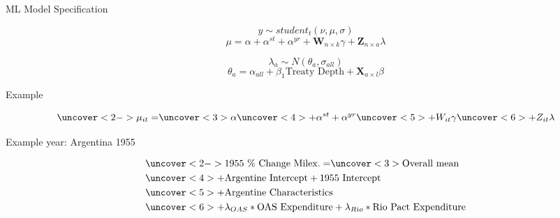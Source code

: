 \documentclass[12pt]{beamer}
\begin{document}


\begin{frame}{ML Model Specification}

\begin{equation}
y \sim student_t(\nu, \mu, \sigma)
\end{equation}
\begin{equation}
\mu = \alpha + \alpha^{st} + \alpha^{yr} +\textbf{W}_{n \times k} \gamma + \textbf{Z}_{n \times a} \lambda
\end{equation}

\begin{equation}
\lambda_{a} \sim N(\theta_{a}, \sigma_{all})
\end{equation}
\begin{equation}
\theta_a = \alpha_{all} + \beta_1 \mbox{Treaty Depth} + \textbf{X}_{a \times l} \beta
\end{equation}


\end{frame}



\begin{frame}{Example}


\begin{equation*}
\uncover<2->{\mu_{it} =} \uncover<3>{\alpha} \uncover<4>{+ \alpha^{st} + \alpha^{yr}} \uncover<5>{+ W_{it} \gamma} \uncover<6>{+ Z_{it} \lambda}
\end{equation*}

Example year: Argentina 1955

\begin{equation*}
\begin{split}
& \uncover<2->{\mbox{1955 \% Change Milex.} = } \uncover<3>{\mbox{Overall mean}} \\
& \uncover<4>{+ \mbox{Argentine Intercept} + \mbox{1955 Intercept}} \\
& \uncover<5>{+ \mbox{Argentine Characteristics}} \\
& \uncover<6>{+ \lambda_{OAS} * \mbox{OAS Expenditure} + \lambda_{Rio} * \mbox{Rio Pact Expenditure}}
\end{split}
\end{equation*}



\end{frame}
\end{document}
